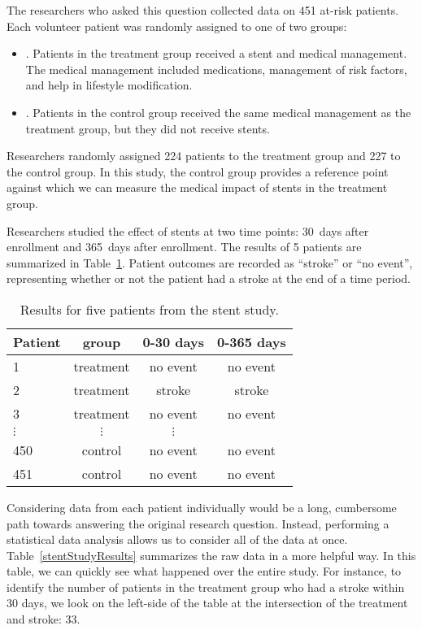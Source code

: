 The researchers who asked this question collected data on 451 at-risk patients. Each volunteer patient was randomly assigned to one of two groups:
\begin{itemize}
\item[]. Patients in the treatment group received a stent and medical management. The medical management included medications, management of risk factors, and help in lifestyle modification. 
\item[]. Patients in the control group received the same medical management as the treatment group, but they did not receive stents.
\end{itemize}
Researchers randomly assigned 224 patients to the treatment group and 227 to the control group. In this study, the control group provides a reference point against which we can measure the medical impact of stents in the treatment group.

Researchers studied the effect of stents at two time points: 30~days after enrollment and 365~days after enrollment. The results of 5 patients are summarized in Table~\ref{stentStudyResultsDF}. Patient outcomes are recorded as ``stroke'' or ``no event'', representing whether or not the patient had a stroke at the end of a time period.

\begin{table}[h]
\centering
\begin{tabular}{l ccc}
\hline
Patient	&	group	&	0-30 days 	&	0-365 days \\
\hline
1		&	treatment &	no event &	no event \\
2		&	treatment &	stroke & stroke \\
3		&	treatment &	no event & no event \\
$\vdots$	&	$\vdots$	  &	$\vdots$ \\
450	&	control &	no event &	no event \\
451	&	control &	no event &	no event \\
\hline
\end{tabular}
\caption{Results for five patients from the stent study.}
\label{stentStudyResultsDF}
\end{table}

Considering data from each patient individually would be a long, cumbersome path towards answering the original research question. Instead, performing a statistical data analysis allows us to consider all of the data at once. Table~\ref{stentStudyResults} summarizes the raw data in a more helpful way. In this table, we can quickly see what happened over the entire study. For instance, to identify the number of patients in the treatment group who had a stroke within 30 days, we look on the left-side of the table at the intersection of the treatment and stroke: 33.

